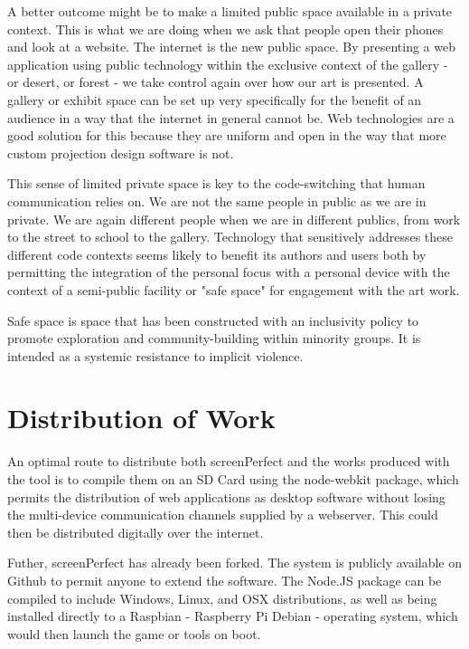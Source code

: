 A better outcome might be to make a limited public space available in a private context. This is what we are doing when we ask that people open their phones and look at a website. The internet is the new public space. By presenting a web application using public technology within the exclusive context of the gallery - or desert, or forest - we take control again over how our art is presented. A gallery or exhibit space can be set up very specifically for the benefit of an audience in a way that the internet in general cannot be. Web technologies are a good solution for this because they are uniform and open in the way that more custom projection design software is not.

This sense of limited private space is key to the code-switching that human communication relies on. We are not the same people in public as we are in private. We are again different people when we are in different publics, from work to the street to school to the gallery. Technology that sensitively addresses these different code contexts seems likely to benefit its authors and users both by permitting the integration of the personal focus with a personal device with the context of a semi-public facility or "safe space" for engagement with the art work.

Safe space is space that has been constructed with an inclusivity policy to promote exploration and community-building within minority groups. It is intended as a systemic resistance to implicit violence. 

\section{Distribution of Work}
An optimal route to distribute both screenPerfect and the works produced with the tool is to compile them on an SD Card using the node-webkit package, which permits the distribution of web applications as desktop software without losing the multi-device communication channels supplied by a webserver. This could then be distributed digitally over the internet.

Futher, screenPerfect has already been forked. The system is publicly available on Github to permit anyone to extend the software. The Node.JS package can be compiled to include Windows, Linux, and OSX distributions, as well as being installed directly to a Raspbian - Raspberry Pi Debian - operating system, which would then launch the game or tools on boot. 

